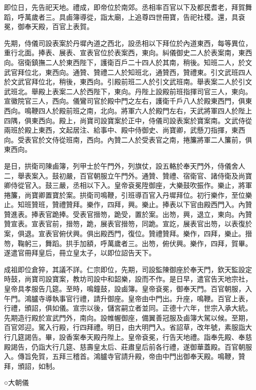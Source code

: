 即位日，先告祀天地。禮成，即帝位於南郊。丞相率百官以下及都民耆老，拜賀舞蹈，呼萬歲者三。具鹵簿導從，詣太廟，上追尊四世冊寶，告祀社稷。還，具袞冕，御奉天殿，百官上表賀。

先期，侍儀司設表案於丹墀內道之西北，設丞相以下拜位於內道東西，每等異位，重行北面。捧表、展表、宣表官位於表案西，東向。糾儀御史二人於表案南，東西向。宿衛鎮撫二人於東西陛下，護衛百戶二十四人於其南，稍後。知班二人，於文武官拜位北，東西向。通贊、贊禮二人於知班北，通贊西，贊禮東。引文武班四人於文武官拜位北，稍後，東西向。引殿前班二人於引文武班南。舉表案二人於引文武班北。舉殿上表案二人於西陛下，東向。丹陛上設殿前班指揮司官三人，東向。宣徽院官三人，西向。儀鸞司官於殿中門之左右，護衛千戶八人於殿東西門，俱東西向。鳴鞭四人於殿前班之南，北向。將軍六人於殿門左右，天武將軍四人於陛上四隅，俱東西向。殿上，尚寶司設寶案於正中，侍儀司設表案於寶案南。文武侍從兩班於殿上東西，文起居注、給事中、殿中侍御史、尚寶卿，武懸刀指揮，東西向。受表官於文侍從班南，西向。內贊二人於受表官之南，捲簾將軍二人簾前，俱東西向。

是日，拱衛司陳鹵簿，列甲士於午門外，列旗仗，設五輅於奉天門外，侍儀舍人二，舉表案入。鼓初嚴，百官朝服立午門外。通贊、贊禮、宿衛官、諸侍衛及尚寶卿侍從官入。鼓三嚴，丞相以下入。皇帝袞冕陞御座，大樂鼓吹振作。樂止，將軍捲簾，尚寶卿置寶於案。拱衛司鳴鞭，引班導百官入丹墀拜位。初行樂作，至位樂止。知班贊班，贊禮贊拜。樂作，四拜，興。樂止。捧表以下官由殿西門入。內贊贊進表。捧表官跪捧。受表官搢笏，跪受，置於案。出笏，興，退立，東向。內贊贊宣表。宣表官前，搢笏，跪，展表官搢笏，同跪。宣訖，展表官出笏，以表復於案，俱退。宣表官俯伏興。俱出殿西門，復位。贊禮贊拜。樂作，四拜，樂止。搢笏，鞠躬三，舞蹈。拱手加額，呼萬歲者三。出笏，俯伏興。樂作，四拜，賀畢。遂遣官冊拜皇后，冊立皇太子，以即位詔告天下。

成祖即位倉猝，其議不詳。仁宗即位，先期，司設監陳御座於奉天門，欽天監設定時鼓，尚寶司設寶案，教坊司設中和韶樂，設而不作。是日早，遣官告天地宗社，皇帝具孝服告几筵。至時，鳴鐘鼓，設鹵簿。皇帝袞冕，御奉天門。百官朝服，入午門。鴻臚寺導執事官行禮，請升御座。皇帝由中門出。升座，鳴鞭。百官上表，行禮，頒詔，俱如儀。宣宗以後，儲宮嗣立者並同。正德十六年，世宗入承大統。先期造行殿於宣武門外，南向。設帷幄御座，備翼善冠服及鹵簿大駕以候。至期，百官郊迎。駕入行殿，行四拜禮。明日，由大明門入。省詔草，改年號，素服詣大行几筵謁告。畢，設香案奉天殿丹陛上。皇帝袞冕，行告天地禮。詣奉先殿、奉慈殿謁告，仍詣大行几筵、慈壽皇太后、莊肅皇后前各行禮，遂御華蓋殿。百官朝服入。傳旨免賀，五拜三稽首。鴻臚寺官請升殿，帝由中門出御奉天殿。鳴鞭，贊拜，頒詔，如制。

○大朝儀


